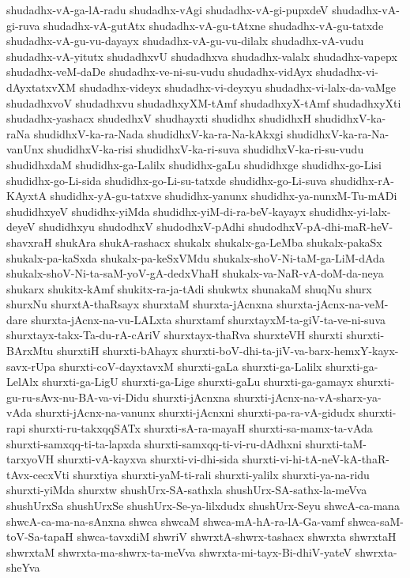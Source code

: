 {shudadhx-vA-ga-lA-radu
shudadhx-vAgi
shudadhx-vA-gi-pupxdeV
shudadhx-vA-gi-ruva
shudadhx-vA-gutAtx
shudadhx-vA-gu-tAtxne
shudadhx-vA-gu-tatxde
shudadhx-vA-gu-vu-dayayx
shudadhx-vA-gu-vu-dilalx
shudadhx-vA-vudu
shudadhx-vA-yitutx
shudadhxvU
shudadhxva
shudadhx-valalx
shudadhx-vapepx
shudadhx-veM-daDe
shudadhx-ve-ni-su-vudu
shudadhx-vidAyx
shudadhx-vi-dAyxtatxvXM
shudadhx-videyx
shudadhx-vi-deyxyu
shudadhx-vi-lalx-da-vaMge
shudadhxvoV
shudadhxvu
shudadhxyXM-tAmf
shudadhxyX-tAmf
shudadhxyXti
shudadhx-yashacx
shudedhxV
shudhayxti
shudidhx
shudidhxH
shudidhxV-ka-raNa
shudidhxV-ka-ra-Nada
shudidhxV-ka-ra-Na-kAkxgi
shudidhxV-ka-ra-Na-vanUnx
shudidhxV-ka-risi
shudidhxV-ka-ri-suva
shudidhxV-ka-ri-su-vudu
shudidhxdaM
shudidhx-ga-Lalilx
shudidhx-gaLu
shudidhxge
shudidhx-go-Lisi
shudidhx-go-Li-sida
shudidhx-go-Li-su-tatxde
shudidhx-go-Li-suva
shudidhx-rA-KAyxtA
shudidhx-yA-gu-tatxve
shudidhx-yanunx
shudidhx-ya-nunxM-Tu-mADi
shudidhxyeV
shudidhx-yiMda
shudidhx-yiM-di-ra-beV-kayayx
shudidhx-yi-lalx-deyeV
shudidhxyu
shudodhxV
shudodhxV-pAdhi
shudodhxV-pA-dhi-maR-heV-shavxraH
shukAra
shukA-rashacx
shukalx
shukalx-ga-LeMba
shukalx-pakaSx
shukalx-pa-kaSxda
shukalx-pa-keSxVMdu
shukalx-shoV-Ni-taM-ga-LiM-dAda
shukalx-shoV-Ni-ta-saM-yoV-gA-dedxVhaH
shukalx-va-NaR-vA-doM-da-neya
shukarx
shukitx-kAmf
shukitx-ra-ja-tAdi
shukwtx
shunakaM
shuqNu
shurx
shurxNu
shurxtA-thaRsayx
shurxtaM
shurxta-jAcnxna
shurxta-jAcnx-na-veM-dare
shurxta-jAcnx-na-vu-LALxta
shurxtamf
shurxtayxM-ta-giV-ta-ve-ni-suva
shurxtayx-takx-Ta-du-rA-cAriV
shurxtayx-thaRva
shurxteVH
shurxti
shurxti-BArxMtu
shurxtiH
shurxti-bAhayx
shurxti-boV-dhi-ta-jiV-va-barx-hemxY-kayx-savx-rUpa
shurxti-coV-dayxtavxM
shurxti-gaLa
shurxti-ga-Lalilx
shurxti-ga-LelAlx
shurxti-ga-LigU
shurxti-ga-Lige
shurxti-gaLu
shurxti-ga-gamayx
shurxti-gu-ru-sAvx-nu-BA-va-vi-Didu
shurxti-jAcnxna
shurxti-jAcnx-na-vA-sharx-ya-vAda
shurxti-jAcnx-na-vanunx
shurxti-jAcnxni
shurxti-pa-ra-vA-gidudx
shurxti-rapi
shurxti-ru-takxqqSATx
shurxti-sA-ra-mayaH
shurxti-sa-mamx-ta-vAda
shurxti-samxqq-ti-ta-lapxda
shurxti-samxqq-ti-vi-ru-dAdhxni
shurxti-taM-tarxyoVH
shurxti-vA-kayxva
shurxti-vi-dhi-sida
shurxti-vi-hi-tA-neV-kA-thaR-tAvx-cecxVti
shurxtiya
shurxti-yaM-ti-rali
shurxti-yalilx
shurxti-ya-na-ridu
shurxti-yiMda
shurxtw
shushUrx-SA-sathxla
shushUrx-SA-sathx-la-meVva
shushUrxSa
shushUrxSe
shushUrx-Se-ya-lilxdudx
shushUrx-Seyu
shwcA-ca-mana
shwcA-ca-ma-na-sAnxna
shwca
shwcaM
shwca-mA-hA-ra-lA-Ga-vamf
shwca-saM-toV-Sa-tapaH
shwca-tavxdiM
shwriV
shwrxtA-shwrx-tashacx
shwrxta
shwrxtaH
shwrxtaM
shwrxta-ma-shwrx-ta-meVva
shwrxta-mi-tayx-Bi-dhiV-yateV
shwrxta-sheYva
}
